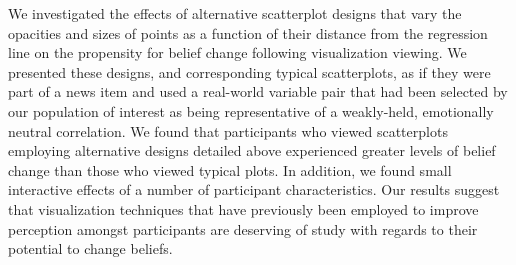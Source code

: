 \documentclass[manuscript,screen,review,anonymous]{acmart}
\begin{document}
We investigated the effects of alternative scatterplot designs that vary
the opacities and sizes of points as a function of their distance from
the regression line on the propensity for belief change following
visualization viewing. We presented these designs, and corresponding
typical scatterplots, as if they were part of a news item and used a
real-world variable pair that had been selected by our population of
interest as being representative of a weakly-held, emotionally neutral
correlation. We found that participants who viewed scatterplots
employing alternative designs detailed above experienced greater levels
of belief change than those who viewed typical plots. In addition, we
found small interactive effects of a number of participant
characteristics. Our results suggest that visualization techniques that
have previously been employed to improve perception amongst participants
are deserving of study with regards to their potential to change
beliefs.




\end{document}
